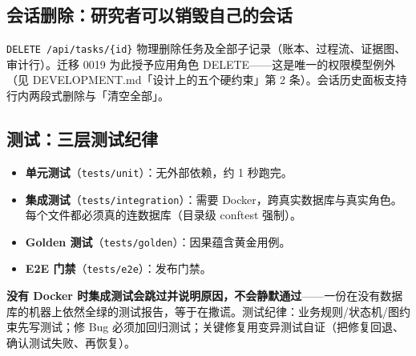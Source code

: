 \subsection{会话删除：研究者可以销毁自己的会话}

\texttt{DELETE /api/tasks/\{id\}} 物理删除任务及全部子记录（账本、过程流、证据图、审计行）。迁移 0019 为此授予应用角色 DELETE——这是唯一的权限模型例外（见 DEVELOPMENT.md「设计上的五个硬约束」第 2 条）。会话历史面板支持行内两段式删除与「清空全部」。

\subsection{测试：三层测试纪律}

\begin{itemize}
\item \textbf{单元测试}（\texttt{tests/unit}）：无外部依赖，约 1 秒跑完。
\item \textbf{集成测试}（\texttt{tests/integration}）：需要 Docker，跨真实数据库与真实角色。每个文件都必须真的连数据库（目录级 conftest 强制）。
\item \textbf{Golden 测试}（\texttt{tests/golden}）：因果蕴含黄金用例。
\item \textbf{E2E 门禁}（\texttt{tests/e2e}）：发布门禁。
\end{itemize}

\textbf{没有 Docker 时集成测试会跳过并说明原因，不会静默通过}——一份在没有数据库的机器上依然全绿的测试报告，等于在撒谎。测试纪律：业务规则/状态机/图约束先写测试；修 Bug 必须加回归测试；关键修复用变异测试自证（把修复回退、确认测试失败、再恢复）。
